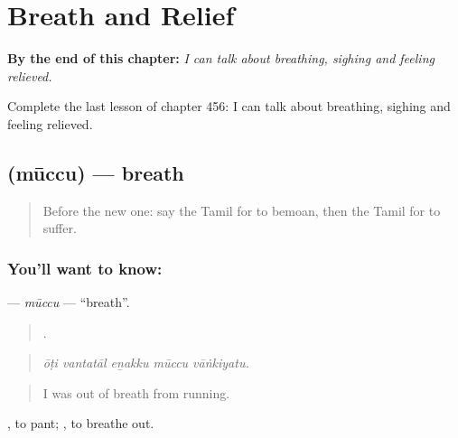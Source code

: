 
\chapter{Breath and Relief}
\label{ch:ta-breath-and-relief}

\begin{chapteropening}
\textbf{By the end of this chapter:} \emph{I can talk about breathing, sighing and feeling relieved.}

Complete the last lesson of chapter 456: I can talk about breathing, sighing and feeling relieved.
\end{chapteropening}

\section[\texorpdfstring{\ta{மூச்சு} (mūccu)}{மூச்சு (mūccu)}]{ (mūccu) — breath}

\label{lesson:TA-C456-muccu}



\begin{quote}
Before the new one: say the Tamil for to bemoan, then the Tamil for to suffer.
\end{quote}

\subsection*{You'll want to know: }
\textbf{} — \emph{mūccu} — \textquotedblleft{}breath\textquotedblright{}.

\begin{quote}
    .
\end{quote}

\begin{quote}
\emph{ōṭi vantatāl eṉakku mūccu vāṅkiyatu.}
\end{quote}

\begin{quote}
I was out of breath from running.
\end{quote}

 , to pant;  , to breathe out.

